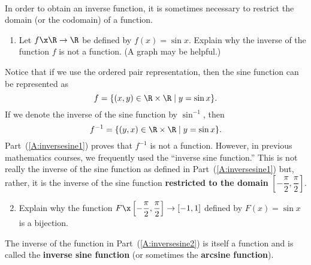 \begin{activity} \label{A:inversesine} \hfill \\
In order to obtain an inverse function, it is sometimes necessary to restrict the domain (or the codomain) of a function.

\begin{enumerate}
\item Let  $f\x \R \to \R$ be defined by  $f( x ) = \sin x$.  Explain why the inverse of the function  $f$  is not a function.  (A graph may be helpful.)  \label{A:inversesine1}
\end{enumerate}

Notice that if we use the ordered pair representation, then the sine function can be represented as
\[
f  = \left\{ { {( {x, y} ) \in \R \times \R } \mid y = \sin x} \right\}\!.
\]
If we denote the inverse of the sine function by  $\sin ^{ - 1} $, then
\[
f^{ - 1}  = \left\{ { {( {y, x} ) \in \R \times \R } \mid y = \sin x} \right\}\!.
\]
Part~(\ref{A:inversesine1}) proves that  $f^{ - 1} $  is not a function.  However, in previous mathematics courses, we frequently used the ``inverse sine function.''  This is not really the inverse of the sine function as defined in Part~(\ref{A:inversesine1}) but, rather, it is the inverse of the \linebreak
\vspace{2pt}
\noindent
sine function \textbf{restricted to the domain}  
$\left[ {-\dfrac{{\pi }}{2}, \dfrac{\pi }{2}} \right]$.

\begin{enumerate}
\setcounter{enumi}{1}
\item Explain why the function  
$F\x \left[ {- \dfrac{{\pi }}{2}, \dfrac{\pi }{2}} \right] \to \left[ { - 1, 1} \right]$
defined by 
$F( x ) = \sin x$ is a bijection.  \label{A:inversesine2}
\end{enumerate}

The inverse of the function in Part~(\ref{A:inversesine2}) is itself a function and is called the \textbf{inverse sine function}
%
 (or sometimes the \textbf{arcsine function}).
%


\end{activity}
